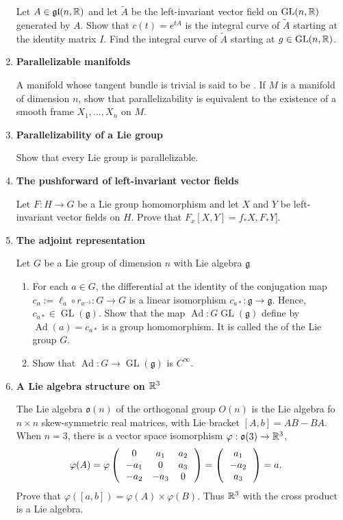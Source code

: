 \documentclass[12pt,a4paper]{report}
\newcommand{\GL}{\operatorname{GL}}
\newcommand{\GLA}{\mathfrak{gl}}
\newcommand{\AD}{\operatorname{Ad}}
\begin{document}
\begin{enumerate}[label=\textbf{16.\arabic*.}]
	Let $A \in \GLA(n,\R)$ and let $\tilde{A}$ be the left-invariant vector field on $\GL(n, \R)$ generated by $A$.  Show that $c(t)=e^{tA}$ is the integral curve of $\tilde{A}$ starting at the identity matrix $I$.  Find the integral curve of $\tilde{A}$ starting at $g \in \GL(n,\R)$.
	
	\item \textbf{Parallelizable manifolds}
	
	A manifold whose tangent bundle is trivial is said to be .  If $M$ is a manifold of dimension $n$, show that parallelizability is equivalent to the existence of a smooth frame $X_1, \dots, X_n$ on $M$.
	
	\item \textbf{Parallelizability of a Lie group}
	
	Show that every Lie group is parallelizable.
	
	\item \textbf{The pushforward of left-invariant vector fields}
	
	Let $F: H \to G$ be a Lie group homomorphism and let $X$ and $Y$ be left-invariant vector fields on $H$.  Prove that $F_x[X,Y]=f_*X, F_*Y]$.
	
	\item \textbf{The adjoint representation}
	
	Let $G$ be a Lie group of dimension $n$ with Lie algebra $\mathfrak{g}$
	
	\begin{enumerate}[label=(\alph*)]
	
		\item For each $a \in G$, the differential at the identity of the conjugation map $c_a := \ell_a \circ r_{a^{-1}} : G \to G$ is a linear isomorphism $c_{a*}:\mathfrak{g} \to \mathfrak{g}$.  Hence, $c_{a*} \in \GL(\mathfrak{g})$.  Show that the map $\AD:G \GL(\mathfrak{g})$ define by $\AD(a)= c_{a*}$ is a group homomorphism.  It is called the  of the Lie group $G$.
		
		\item Show that $\AD: G \to \GL(\mathfrak{g})$ is $C^\infty$.
	
	\end{enumerate}
	
	\item \textbf{A Lie algebra structure on $\mathbb{R}^3$}
	
	The Lie algebra $\mathfrak{o}(n)$ of the orthogonal group $O(n)$ is the Lie algebra fo $n \times n$ skew-symmetric real matrices, with Lie bracket $[A,b]=AB-BA$.  When $n = 3$, there is a vector space isomorphism $\varphi : \mathfrak{o}(3) \to \mathbb{R}^3$,
	\begin{align*}
		\varphi(A) &= \varphi \left (\,  \begin{array}{c c c} 0&a_1&a_2 \\ -a_1 & 0 & a_3 \\ -a_2 & -a_3 & 0 \end{array}  \,\right ) = \left (\, \begin{array}{c} a_1\\-a_2\\a_3 \end{array}  \,\right ) = a.
	\end{align*}Prove that $\varphi([a,b])=\varphi(A) \times \varphi(B)$.  Thus $\mathbb{R}^3$ with the cross product is a Lie algebra.
	
\end{enumerate}
\end{document}
